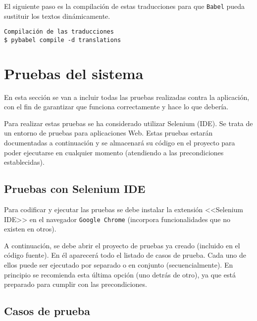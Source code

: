 El siguiente paso es la compilación de estas traducciones para que \texttt{Babel} pueda sustituir
los textos dinámicamente.

\begin{tcolorbox}[colback=cyan!5!white,colframe=cyan!75!black,fontupper=\footnotesize,title=Compilación de traducciones (desde \texttt{/web/app})]
\begin{verbatim}
Compilación de las traducciones
$ pybabel compile -d translations 
\end{verbatim}
\end{tcolorbox}

\section{Pruebas del sistema}

En esta sección se van a incluir todas las pruebas realizadas contra la
aplicación, con el fin de garantizar que funciona correctamente y hace lo que
debería.

Para realizar estas pruebas se ha considerado utilizar Selenium (IDE). Se trata
de un entorno de pruebas para aplicaciones Web. Estas pruebas estarán
documentadas a continuación y se almacenará su código en el proyecto para poder
ejecutarse en cualquier momento (atendiendo a las precondiciones establecidas).

\subsection{Pruebas con Selenium IDE}

Para codificar y ejecutar las pruebas se debe instalar la extensión <<Selenium
IDE>> en el navegador \texttt{Google Chrome} (incorpora funcionalidades que no
existen en otros). 

A continuación, se debe abrir el proyecto de pruebas ya creado (incluido en el
código fuente). En él aparecerá todo el listado de casos de prueba. Cada uno de
ellos puede ser ejecutado por separado o en conjunto (secuencialmente). En
principio se recomienda esta última opción (uno detrás de otro), ya que está
preparado para cumplir con las precondiciones.


\subsection{Casos de prueba}

